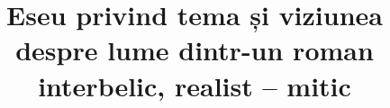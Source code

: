 

\title{Eseu privind tema și viziunea despre lume dintr-un roman interbelic, realist -- mitic}


 \maketitle %
 


